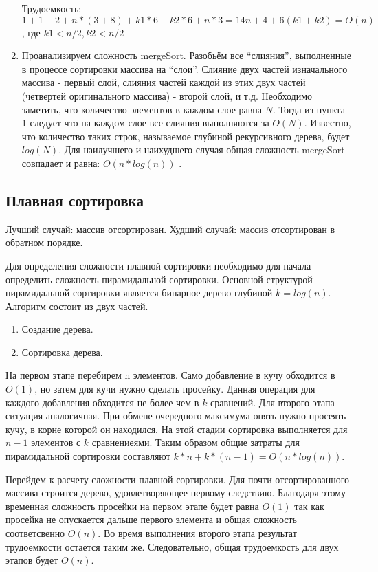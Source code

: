 \begin{enumerate}
\begin{longtable}{|l c|}
\end{longtable}

Трудоемкость:  $1 + 1 + 2 + n * (3 + 8) + k1 * 6 + k2 * 6 + n * 3= 14n + 4  + 6(k1 + k2)= O(n)$, где $k1 < n/2, k2  < n/2$

\item Проанализируем сложность mergeSort. Разобьём все “слияния”, выполненные в процессе сортировки массива на “слои”. Слияние двух частей изначального массива - первый слой, слияния частей каждой из этих двух частей (четвертей оригинального массива) - второй слой, и т.д. Необходимо заметить, что количество элементов в каждом слое равна $N$. Тогда из пункта 1 следует что на каждом слое все слияния выполняются за $O(N)$. Известно, что количество таких строк, называемое глубиной рекурсивного дерева, будет $log(N)$.
Для наилучшего и наихудшего случая общая сложность mergeSort совпадает и равна: $O(n * log(n))$ \cite{algos}.
\end{enumerate}

\subsection{Плавная сортировка} 
Лучший случай: массив отсортирован.
Худший случай: массив отсортирован в обратном порядке.

Для определения сложности плавной сортировки необходимо для начала определить сложность пирамидальной сортировки.  Основной структурой пирамидальной сортировки является бинарное дерево глубиной $k = log(n)$. Алгоритм состоит из двух частей.
\begin{enumerate}
	\item Создание дерева.
	\item Сортировка дерева.
\end{enumerate} 

На первом этапе перебирем n элементов. Само добавление в кучу обходится в $O(1)$, но затем для кучи нужно сделать просейку. Данная операция для каждого добавления обходится не более чем в $k$ сравнений. Для второго этапа ситуация аналогичная. При обмене очередного максимума опять нужно просеять кучу, в корне которой он находился. На этой стадии сортировка выполняется для $n-1$ элементов с $k$ сравнениеями. 	Таким образом общие затраты для пирамидальной сортировки составляют $k * n + k * (n - 1) = O(n*log(n))$.

 Перейдем к расчету сложности плавной сортировки. Для почти отсортированного массива строится дерево, удовлетворяющее первому следствию. Благодаря этому временная сложность просейки на первом этапе будет равна $O(1)$ так как просейка не опускается дальше первого элемента и общая сложность соответсвенно $O(n)$. Во время выполнения второго этапа результат трудоемкости остается таким же. Следовательно, общая трудоемкость для двух этапов будет $O(n)$. 
 
